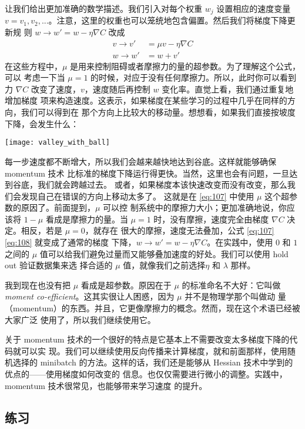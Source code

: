 让我们给出更加准确的数学描述。我们引入对每个权重 $w_j$ 设置相应的速度变量
$v=v_1,v_2,...$。注意，这里的权重也可以笼统地包含偏置。然后我们将梯度下降更新规
则 $w\rightarrow w'=w-\eta\nabla C$ 改成
\begin{align} 
  v \rightarrow v' &= \mu v - \eta \nabla C \label{eq:107}\tag{107}\\
  w \rightarrow w' &= w+v' \label{eq:108}\tag{108}
\end{align}
在这些方程中，$\mu$ 是用来控制阻碍或者摩擦力的量的超参数。为了理解这个公式，可以
考虑一下当 $\mu=1$ 的时候，对应于没有任何摩擦力。所以，此时你可以看到力 $\nabla
C$ 改变了速度，$v$，速度随后再控制 $w$ 变化率。直觉上看，我们通过重复地增加梯度
项来构造速度。这表示，如果梯度在某些学习的过程中几乎在同样的方向，我们可以得到在
那个方向上比较大的移动量。想想看，如果我们直接按坡度下降，会发生什么：
\begin{center}
  \texttt{[image: valley\_with\_ball]}
\end{center}

每一步速度都不断增大，所以我们会越来越快地达到谷底。这样就能够确保 momentum 技术
比标准的梯度下降运行得更快。当然，这里也会有问题，一旦达到谷底，我们就会跨越过去。
或者，如果梯度本该快速改变而没有改变，那么我们会发现自己在错误的方向上移动太多了。
这就是在 \eqref{eq:107} 中使用 $\mu$ 这个超参数的原因了。前面提到，$\mu$ 可以控
制系统中的摩擦力大小；更加准确地说，你应该将 $1-\mu$ 看成是摩擦力的量。当
$\mu=1$ 时，没有摩擦，速度完全由梯度 $\nabla C$ 决定。相反，若是 $\mu=0$，就存在
很大的摩擦，速度无法叠加，公式 \eqref{eq:107} \eqref{eq:108} 就变成了通常的梯度
下降，$w\rightarrow w'=w-\eta \nabla C$。在实践中，使用 $0$ 和 $1$ 之间的 $\mu$
值可以给我们避免过量而又能够叠加速度的好处。我们可以使用 hold out 验证数据集来选
择合适的 $\mu$ 值，就像我们之前选择$\eta$ 和 $\lambda$ 那样。

我到现在也没有把 $\mu$ 看成是超参数。原因在于 $\mu$ 的标准命名不大好：它叫做
\emph{moment co-efficient}。这其实很让人困惑，因为 $\mu$ 并不是物理学那个叫做动
量（momentum）的东西。并且，它更像摩擦力的概念。然而，现在这个术语已经被大家广泛
使用了，所以我们继续使用它。

关于 momentum 技术的一个很好的特点是它基本上不需要改变太多梯度下降的代码就可以实
现。我们可以继续使用反向传播来计算梯度，就和前面那样，使用随机选择的 minibatch
的方法。这样的话，我们还是能够从 Hessian 技术中学到的优点的——使用梯度如何改变的
信息。也仅仅需要进行微小的调整。实践中，momentum 技术很常见，也能够带来学习速度
的提升。

\subsection*{练习}

